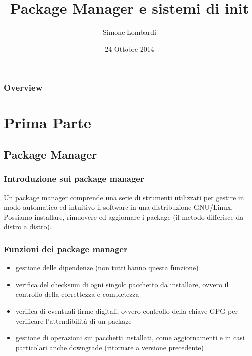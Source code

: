 \documentclass{beamer}
\title[Linux Day 2014]{Package Manager e sistemi di init}
\author{Simone Lombardi}
\institute[HCSSLUG] 
{
Universit\`a degli studi di Salerno \\ 
\medskip
\textit{smlb@archlinux.info} 
}
\date{24 Ottobre 2014}
\begin{document}
\begin{frame}
\titlepage 
\end{frame}

\begin{frame}
\frametitle{Overview} 
\tableofcontents 
\end{frame}


\section{Prima Parte} 

\subsection{Package Manager} 

\begin{frame}
\frametitle{Introduzione sui package manager}
Un package manager comprende una serie di strumenti utilizzati per gestire in modo automatico ed intuitivo il software in una distribuzione GNU/Linux. Possiamo installare, rimuovere ed aggiornare i package (il metodo differisce da distro a distro). 
\end{frame}


\begin{frame}
	\frametitle{Funzioni dei package manager}
	\begin{itemize}
		\item gestione delle dipendenze (non tutti hanno questa funzione)
		\item verifica del checksum di ogni singolo pacchetto da installare, ovvero il controllo della correttezza e completezza
		\item verifica di eventuali firme digitali, ovvero controllo della chiave GPG per verificare l'attendibilit\`a di un package
		\item gestione di operazioni sui pacchetti installati, come aggiornamenti e in casi particolari anche downgrade (ritornare a versione precedente)
	\end{itemize}
\end{frame}
\end{document}
